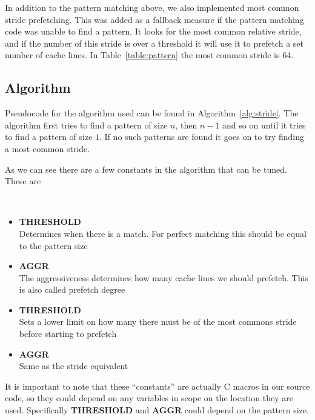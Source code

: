 In addition to the pattern matching above, we also implemented most common stride
prefetching. This was added as a fallback measure if the pattern matching code
was unable to find a pattern.
It looks for the most common relative stride, and if the number
of this stride is over a threshold
it will use it to prefetch a
set number of cache lines.
In Table~\ref{table:pattern} the most common stride is 64.

\subsection{Algorithm}\label{sec:algorithm}

Pseudocode for the algorithm used can be found in Algorithm~\ref{alg:stride}.
The algorithm first tries to find a pattern of size $n$, then $n-1$ and so
on until it tries to find a pattern of size $1$. If no such patterns are
found it goes on to try finding a most common stride.

As we can see there are a few constants in the algorithm that can be
tuned. These are

~
\begin{itemize}
	\item \textbf{ THRESHOLD} \\ Determines when there is a match.
	For perfect matching this should be equal to the pattern size \\
	\item \textbf{ AGGR} \\ The aggressiveness determines how many
	cache lines we should prefetch. This is also called prefetch degree \\
	\item \textbf{ THRESHOLD} \\ Sets a lower limit on how many
	there must be of the most commons stride before starting to prefetch \\
	\item \textbf{ AGGR} \\  Same as the stride equivalent \\
\end{itemize}

It is important to note that these ``constants'' are actually C macros in our
source code, so they could depend on any variables in scope on the location
they are used.
Specifically \textbf{THRESHOLD} and
\textbf{AGGR} could depend on the pattern size.

